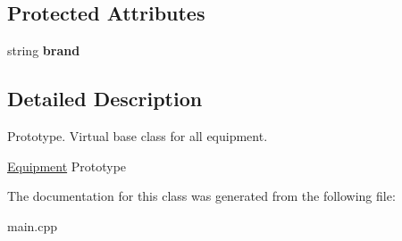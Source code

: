 \subsection*{Protected Attributes}
\begin{DoxyCompactItemize}
\item 
\hypertarget{class_equipment_a03df46453d0266dd69b88b827cbd7f98}{}string {\bfseries brand}\label{class_equipment_a03df46453d0266dd69b88b827cbd7f98}

\end{DoxyCompactItemize}


\subsection{Detailed Description}
Prototype. Virtual base class for all equipment.

\hyperlink{class_equipment}{Equipment} Prototype 

The documentation for this class was generated from the following file\+:\begin{DoxyCompactItemize}
\item 
main.\+cpp\end{DoxyCompactItemize}

